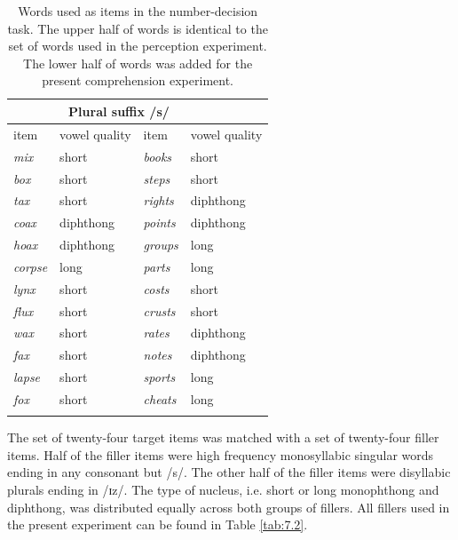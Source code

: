 \begin{table}\fontsize{10}{11}
\caption{Words used as items in the number-decision task. The upper half of words is identical to the set of words used in the perception experiment. The lower half of words was added for the present comprehension experiment.}
\label{tab:7.1}
\centering
\begin{tabular}{llll}
\lsptoprule
\multicolumn{2}{c}{Non-morphemic /s/} & \multicolumn{2}{c}{Plural suffix /s/}  \\
\midrule
item            & vowel quality       & item            & vowel quality        \\
\midrule
\textit{mix}    & short               & \textit{books}  & short                \\
\textit{box}    & short               & \textit{steps}  & short                \\
\textit{tax}    & short               & \textit{rights} & diphthong            \\
\textit{coax}   & diphthong           & \textit{points} & diphthong            \\
\textit{hoax}   & diphthong           & \textit{groups} & long                 \\
\textit{corpse} & long                & \textit{parts}  & long                 \\
\hline
\textit{lynx}   & short               & \textit{costs}  & short                \\
\textit{flux}   & short               & \textit{crusts} & short                \\
\textit{wax}    & short               & \textit{rates}  & diphthong            \\
\textit{fax}    & short               & \textit{notes}  & diphthong            \\
\textit{lapse}  & short               & \textit{sports} & long                 \\
\textit{fox}    & short               & \textit{cheats} & long                \\
\lspbottomrule
\end{tabular}
\end{table}

The set of twenty-four target items was matched with a set of twenty-four filler items. Half of the filler items were high frequency monosyllabic singular words ending in any consonant but /s/. The other half of the filler items were disyllabic plurals ending in /ɪz/. The type of nucleus, i.e. short or long monophthong and diphthong, was distributed equally across both groups of fillers. All fillers used in the present experiment can be found in Table \ref{tab:7.2}.

